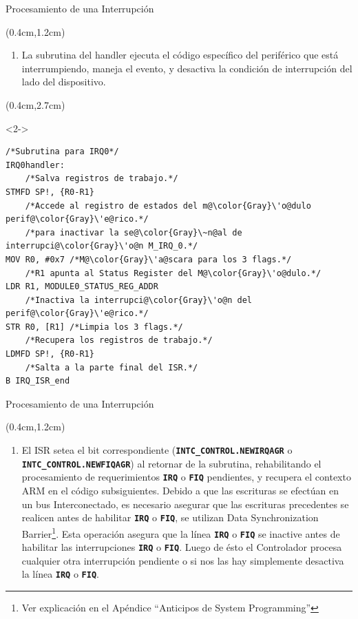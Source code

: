 \documentclass[usenames,table,xcolor={x11names},aspectratio=169]{beamer}
\newcounter{saveenumi}
\newcommand{\seti}{\setcounter{saveenumi}{\value{enumi}}}
\newcommand{\conti}{\setcounter{enumi}{\value{saveenumi}}}
\begin{document}
\begin{frame}[t,fragile]{Procesamiento de una Interrupción}
 \begin{textblock*}{\textwidth}(0.4cm,1.2cm)
  \begin{enumerate}[<+->]\justifying 
    \conti
   \item La subrutina del handler ejecuta el código específico del periférico que está interrumpiendo, maneja el evento, y desactiva la condición de interrupción del lado del dispositivo.
    \seti
  \end{enumerate}
 \end{textblock*}
 \begin{textblock*}{\textwidth}(0.4cm,2.7cm)
  \begin{onlyenv}<2->
   \begin{lstlisting}[basicstyle=\scriptsize,escapechar=\@,numbers=none, frame=single, xleftmargin=20pt, xrightmargin=0pt,]
    /*Subrutina para IRQ0*/
IRQ0handler:
    /*Salva registros de trabajo.*/
STMFD SP!, {R0-R1}
    /*Accede al registro de estados del m@\color{Gray}\'o@dulo perif@\color{Gray}\'e@rico.*/
    /*para inactivar la se@\color{Gray}\~n@al de interrupci@\color{Gray}\'o@n M_IRQ_0.*/
MOV R0, #0x7 /*M@\color{Gray}\'a@scara para los 3 flags.*/
    /*R1 apunta al Status Register del M@\color{Gray}\'o@dulo.*/
LDR R1, MODULE0_STATUS_REG_ADDR 
    /*Inactiva la interrupci@\color{Gray}\'o@n del perif@\color{Gray}\'e@rico.*/
STR R0, [R1] /*Limpia los 3 flags.*/
    /*Recupera los registros de trabajo.*/
LDMFD SP!, {R0-R1}
    /*Salta a la parte final del ISR.*/
B IRQ_ISR_end
   \end{lstlisting}
  \end{onlyenv}
 \end{textblock*}
\end{frame}

\begin{frame}[t]{Procesamiento de una Interrupción}
 \begin{textblock*}{\textwidth}(0.4cm,1.2cm)
  \begin{enumerate}[<+->]\justifying 
    \conti
   \item El ISR setea el bit correspondiente (\textbf{\texttt{INTC\_CONTROL.NEWIRQAGR}} o \textbf{\texttt{INTC\_CONTROL.NEWFIQAGR}}) al retornar de la subrutina, rehabilitando el procesamiento de requerimientos \texttt{\textbf{IRQ}} o \texttt{\textbf{FIQ}} pendientes, y recupera el contexto ARM en el código subsiguientes. Debido a que las escrituras se efectúan en un bus Interconectado, es necesario asegurar que las escrituras precedentes se realicen antes de habilitar \texttt{\textbf{IRQ}} o \texttt{\textbf{FIQ}}, se utilizan Data Synchronization Barrier\footnote{Ver explicación en el Apéndice ``Anticipos de System Programming''}. Esta operación asegura que la línea \texttt{\textbf{IRQ}} o \texttt{\textbf{FIQ}} se inactive antes de habilitar las interrupciones \texttt{\textbf{IRQ}} o \texttt{\textbf{FIQ}}. Luego de ésto el Controlador procesa cualquier otra interrupción pendiente o si nos las hay simplemente desactiva la línea \texttt{\textbf{IRQ}} o \textbf{\texttt{FIQ}}.
    \seti
  \end{enumerate}
 \end{textblock*}
\end{frame}
\end{document}
